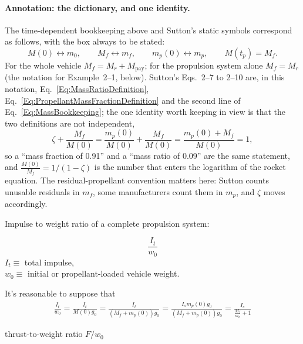 \paragraph*{Annotation: the dictionary, and one identity.}
The time-dependent bookkeeping above and Sutton's static symbols
correspond as follows, with the box always to be stated:
\[
 M(0)\leftrightarrow m_0,\qquad
 M_f\leftrightarrow m_f,\qquad
 m_p(0)\leftrightarrow m_p,\qquad
 M(t_p)=M_f .
\]
For the whole vehicle $M_f=M_r+M_{\text{pay}}$; for the propulsion system
alone $M_f=M_r$ (the notation for Example~2--1, below). Sutton's
Eqs.~2--7 to 2--10 are, in this notation,
Eq.~\ref{Eq:MassRatioDefinition}, Eq.~\ref{Eq:PropellantMassFractionDefinition}
and the second line of Eq.~\ref{Eq:MassBookkeeping}; the one identity worth
keeping in view is that the two definitions are not independent,
\begin{equation}\label{Eq:ZetaPlusMR}
 \zeta+\frac{M_f}{M(0)}
 =\frac{m_p(0)}{M(0)}+\frac{M_f}{M(0)}
 =\frac{m_p(0)+M_f}{M(0)}=1 ,
\end{equation}
so a ``mass fraction of 0.91'' and a ``mass ratio of 0.09'' are the same
statement, and $\frac{M(0)}{M_f}=1/(1-\zeta)$ is the number that enters the
logarithm of the rocket equation. The residual-propellant convention matters
here: Sutton counts unusable residuals in $m_f$, some manufacturers count
them in $m_p$, and $\zeta$ moves accordingly.

Impulse to weight ratio of a complete propulsion system:

\[
\frac{I_t}{w_0}
\]
$I_t \equiv $ total impulse, \\
$w_0 \equiv $ initial or propellant-loaded vehicle weight.

It's reasonable to suppose that
\begin{equation}\label{Eq:ImpulseToWeight}
\begin{gathered}
\frac{I_t}{w_0} = \frac{I_t}{ M(0) g_0}
 = \frac{I_t}{  (M_f + m_p(0)) g_0}
 = \frac{I_s m_p(0) g_0}{ (M_f + m_p(0)) g_0}
 = \frac{ I_s}{ \frac{M_f}{m_p} + 1}
\end{gathered}
\end{equation}

thrust-to-weight ratio $F/w_0$


